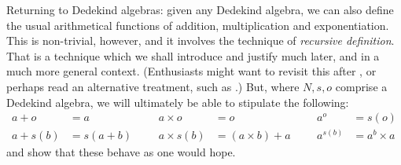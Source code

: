 \documentclass[../../../include/open-logic-section]{subfiles}
\begin{document}
Returning to Dedekind algebras: given any Dedekind algebra, we can
also define the usual arithmetical functions of addition,
multiplication and exponentiation. This is non-trivial, however, and
it involves the technique of \emph{recursive definition}. That is a
technique which we shall introduce and justify much later, and in a
much more general context. (Enthusiasts might want to revisit this
after , or perhaps read an alternative
treatment, such as \citealt[pp.~95--8]{Potter2004}.) But, where $N, s, o$
comprise a Dedekind algebra, we will ultimately be able to stipulate the
following:
\begin{align*}
	{a} + {o} &= {a} & & & {a} \times {o} &= {o} & & & {a}^{o} &= s(o)\\
{a} + {s}({b}) &= {s}({a}+{b}) &&& {a} \times {s}({b}) &= ({a}\times {b}) + {a}  & & & {a}^{{s}({b})} &= {a}^{b} \times {a}
\end{align*}
and show that these behave as one would hope.
\end{document}
